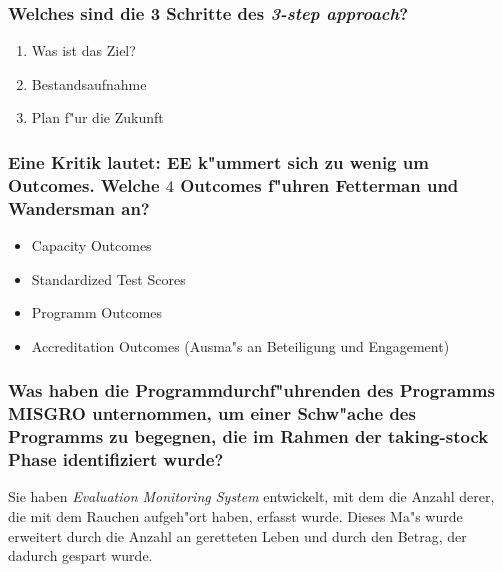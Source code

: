 \subsubsection{Welches sind die 3 Schritte des \emph{3-step approach}?}
\begin{enumerate}
        \item Was ist das Ziel?
        \item Bestandsaufnahme
        \item Plan f"ur die Zukunft
\end{enumerate}

\subsubsection{Eine Kritik lautet: EE k"ummert sich zu wenig um Outcomes. Welche $4$ Outcomes f"uhren Fetterman und Wandersman an?}
\begin{itemize}
        \item Capacity Outcomes
        \item Standardized Test Scores
        \item Programm Outcomes
        \item Accreditation Outcomes (Ausma"s an Beteiligung und Engagement)
\end{itemize}

\subsubsection{Was haben die Programmdurchf"uhrenden des Programms MISGRO unternommen, um einer Schw"ache des Programms zu begegnen, die im Rahmen der taking-stock Phase identifiziert wurde?}
Sie haben \emph{Evaluation Monitoring System} entwickelt, mit dem die Anzahl derer, die mit dem Rauchen aufgeh"ort haben, erfasst wurde. Dieses Ma"s wurde erweitert durch die Anzahl an geretteten Leben und durch den Betrag, der dadurch gespart wurde. 

